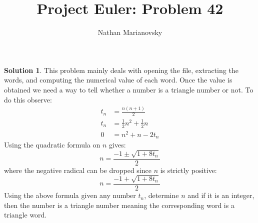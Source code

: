 \documentclass[12pt, letterpaper, onecolumn, conference, final]{IEEEtran}
\title{Project Euler: Problem 42}
\author{Nathan Marianovsky}
\theoremstyle{definition}
\newtheorem*{problem*}{Problem}
\newtheorem*{solution*}{Solution}
\theoremstyle{plain}
\begin{document}
\maketitle

\begin{center}
\end{center}

\vspace{.3cm}
\begin{solution*}
This problem mainly deals with opening the file, extracting the words, and computing the numerical value of each word. Once the value is obtained we need a way to tell whether a number is a triangle number or not. To do this observe:
\begin{equation*}
\begin{split}
t_n &= \frac{n(n+1)}{2} \\
t_n &= \frac{1}{2}n^2 + \frac{1}{2}n \\
0 &= n^2 + n - 2t_n
\end{split}
\end{equation*}
Using the quadratic formula on $n$ gives:
\begin{equation*}
n = \frac{-1 \pm \sqrt{1 + 8t_n}}{2}
\end{equation*}
where the negative radical can be dropped since $n$ is strictly positive:
\begin{equation*}
n = \frac{-1 + \sqrt{1 + 8t_n}}{2}
\end{equation*}
Using the above formula given any number $t_n$, determine $n$ and if it is an integer, then the number is a triangle number meaning the corresponding word is a triangle word.
\end{solution*}
\end{document}
